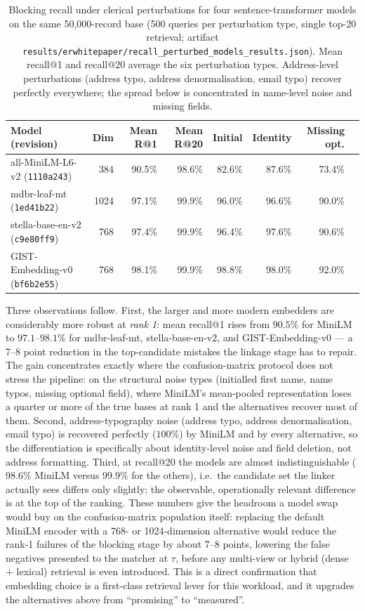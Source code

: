 \documentclass[11pt]{article}
\begin{document}
\begin{table}[h]
\centering
\caption{Blocking recall under clerical perturbations for four sentence-transformer models on the same 50{,}000-record base (500 queries per perturbation type, single top-20 retrieval; artifact \texttt{results/erwhitepaper/recall\_perturbed\_models\_results.json}). Mean recall@1 and recall@20 average the six perturbation types. Address-level perturbations (address typo, address denormalisation, email typo) recover perfectly everywhere; the spread below is concentrated in name-level noise and missing fields.}
\label{tab:recall-models}
\small
\begin{tabular}{lrrrrrrr}
\toprule
Model (revision) & Dim & Mean R@1 & Mean R@20 & Initial & Identity & Missing opt.\\
\midrule
all-MiniLM-L6-v2 (\texttt{1110a243}) & 384 & 90.5\% & 98.6\% & 82.6\% & 87.6\% & 73.4\%\\
mdbr-leaf-mt (\texttt{1ed41b22}) & 1024 & 97.1\% & 99.9\% & 96.0\% & 96.6\% & 90.0\%\\
stella-base-en-v2 (\texttt{c9e80ff9}) & 768 & 97.4\% & 99.9\% & 96.4\% & 97.6\% & 90.6\%\\
GIST-Embedding-v0 (\texttt{bf6b2e55}) & 768 & 98.1\% & 99.9\% & 98.8\% & 98.0\% & 92.0\%\\
\bottomrule
\end{tabular}
\end{table}

\noindent Three observations follow. First, the larger and more modern embedders are considerably more robust at \emph{rank 1}: mean recall@1 rises from $90.5\%$ for MiniLM to $97.1$--$98.1\%$ for mdbr-leaf-mt, stella-base-en-v2, and GIST-Embedding-v0 --- a 7--8 point reduction in the top-candidate mistakes the linkage stage has to repair. The gain concentrates exactly where the confusion-matrix protocol does not stress the pipeline: on the structural noise types (initialled first name, name typos, missing optional field), where MiniLM's mean-pooled representation loses a quarter or more of the true bases at rank 1 and the alternatives recover most of them. Second, address-typography noise (address typo, address denormalisation, email typo) is recovered perfectly ($100\%$) by MiniLM and by every alternative, so the differentiation is specifically about identity-level noise and field deletion, not address formatting. Third, at recall@20 the models are almost indistinguishable ($98.6\%$ MiniLM versus $99.9\%$ for the others), i.e.\ the candidate set the linker actually sees differs only slightly; the observable, operationally relevant difference is at the top of the ranking. These numbers give the headroom a model swap would buy on the confusion-matrix population itself: replacing the default MiniLM encoder with a 768- or 1024-dimension alternative would reduce the rank-1 failures of the blocking stage by about 7--8 points, lowering the false negatives presented to the matcher at $\tau$, before any multi-view or hybrid (dense + lexical) retrieval is even introduced. This is a direct confirmation that embedding choice is a first-class retrieval lever for this workload, and it upgrades the alternatives above from ``promising'' to ``measured''.
\end{document}
